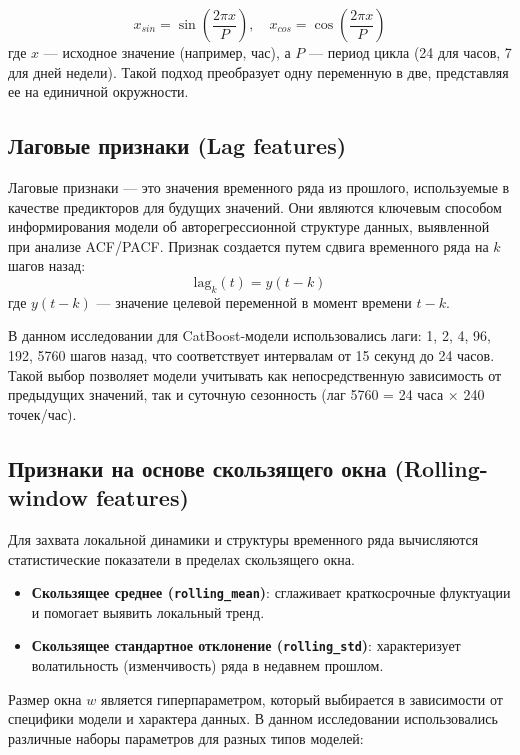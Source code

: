 \begin{equation}
	x_{sin} = \sin\left(\frac{2\pi x}{P}\right), \quad x_{cos} = \cos\left(\frac{2\pi x}{P}\right)
\end{equation}
где $x$ — исходное значение (например, час), а $P$ — период цикла (24 для часов, 7 для дней недели). Такой подход преобразует одну переменную в две, представляя ее на единичной окружности.

\subsection{Лаговые признаки (Lag features)}

\hspace*{1.25cm}Лаговые признаки — это значения временного ряда из прошлого, используемые в качестве предикторов для будущих значений. Они являются ключевым способом информирования модели об авторегрессионной структуре данных, выявленной при анализе ACF/PACF. Признак создается путем сдвига временного ряда на $k$ шагов назад:
\begin{equation}
	\text{lag}_k(t) = y(t-k)
\end{equation}
где $y(t-k)$ — значение целевой переменной в момент времени $t-k$.

\hspace*{1.25cm}В данном исследовании для CatBoost-модели использовались лаги: 1, 2, 4, 96, 192, 5760 шагов назад, что соответствует интервалам от 15 секунд до 24 часов. Такой выбор позволяет модели учитывать как непосредственную зависимость от предыдущих значений, так и суточную сезонность (лаг 5760 = 24 часа $\times$ 240 точек/час).

\subsection{Признаки на основе скользящего окна (Rolling-window features)}

\hspace*{1.25cm}Для захвата локальной динамики и структуры временного ряда вычисляются статистические показатели в пределах скользящего окна.

\begin{itemize}
	\item \textbf{Скользящее среднее (\texttt{rolling\_mean})}: сглаживает краткосрочные флуктуации и помогает выявить локальный тренд.
	\item \textbf{Скользящее стандартное отклонение (\texttt{rolling\_std})}: характеризует волатильность (изменчивость) ряда в недавнем прошлом.
\end{itemize}
Размер окна $w$ является гиперпараметром, который выбирается в зависимости от специфики модели и характера данных. В данном исследовании использовались различные наборы параметров для разных типов моделей:

